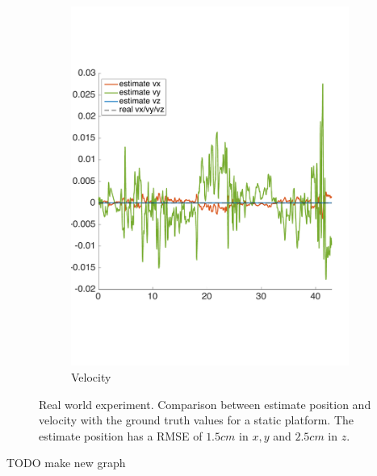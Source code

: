 \begin{figure}[!htbp]
\begin{subfigure}[b]{0.45\textwidth}
        \includegraphics[width=\textwidth]{img/estimate_velocity_static_platform.pdf}
        \caption{Velocity}
        \label{fig:two_ekf_real_world_static}
   \end{subfigure}
  \caption{Real world experiment. Comparison between estimate position and velocity with the ground truth values for a static platform. The estimate position has a RMSE of $1.5cm$ in $x,y$ and $2.5cm$ in $z$.}
  \label{fig:ekf_real_world_static}
\end{figure} 


TODO make new graph


